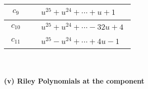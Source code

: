 \documentclass[1p]{elsarticle_modified}
\theoremstyle{definition}
\begin{document}
\begin{tabular}{m{50pt}|m{274pt}}
\hline $$\begin{aligned}c_{9}\end{aligned}$$&$\begin{aligned}
&u^{25}+u^{24}+\cdots+u+1
\end{aligned}$\\
\hline $$\begin{aligned}c_{10}\end{aligned}$$&$\begin{aligned}
&u^{25}+u^{24}+\cdots-32 u+4
\end{aligned}$\\
\hline $$\begin{aligned}c_{11}\end{aligned}$$&$\begin{aligned}
&u^{25}- u^{24}+\cdots+4 u-1
\end{aligned}$\\
\hline
\end{tabular}\\~\\
\newpage\renewcommand{\arraystretch}{1}
\flushleft \textbf{(v) Riley Polynomials at the component}\newline \\
\end{document}
